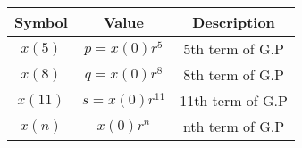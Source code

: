   \begin{tabular}{|c|c|c|}
    \hline
            \textbf{Symbol} & \textbf{Value} & \textbf{Description} \\
    \hline
          $x(5)$ & $p=x(0)r^5$ & 5th term of G.P \\
    \hline
          $x(8)$ & $q=x(0)r^8$ & 8th term of G.P\\
    \hline 
          $x({11})$ &$s=x(0)r^{11}$ &11th term of G.P \\
    \hline
          $x(n)$ &$x(0)r^n$ &nth term of G.P\\
    \hline
  \end{tabular}
